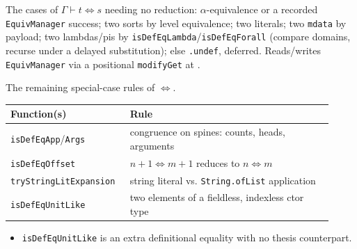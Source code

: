 \begin{definition}
\label{def:kernel-quick-isdefeq}
\leanok
{}

 The cases of $\Gamma \vdash t \Leftrightarrow s$ needing no reduction:
$\alpha$-equivalence or a recorded \texttt{EquivManager} success; two sorts by level equivalence;
two literals; two \texttt{mdata} by payload; two lambdas/pis by
\texttt{isDefEqLambda}/\texttt{isDefEqForall} (compare domains, recurse under a delayed
substitution); else \texttt{.undef}, deferred. Reads/writes \texttt{EquivManager} via a positional
\texttt{modifyGet} at .
\end{definition}

\begin{definition}
\label{family:kernel-isdefeq-aux}
\leanok
{}
 The remaining special-case rules of $\Leftrightarrow$.
\par\smallskip\noindent
\begin{tabular}{p{0.32\linewidth}p{0.60\linewidth}}
\toprule
Function(s) & Rule \\
\midrule
\texttt{isDefEqApp}/\texttt{Args} & congruence on spines: counts, heads, arguments \\
\texttt{isDefEqOffset} & $n{+}1 \Leftrightarrow m{+}1$ reduces to $n \Leftrightarrow m$ \\
\texttt{tryStringLitExpansion} & string literal vs. \texttt{String.ofList} application \\
\texttt{isDefEqUnitLike} & two elements of a fieldless, indexless ctor type \\
\bottomrule
\end{tabular}\par\smallskip
\begin{itemize}
\item {} \texttt{isDefEqUnitLike} is an extra definitional equality with no thesis
counterpart.
\end{itemize}
\end{definition}

